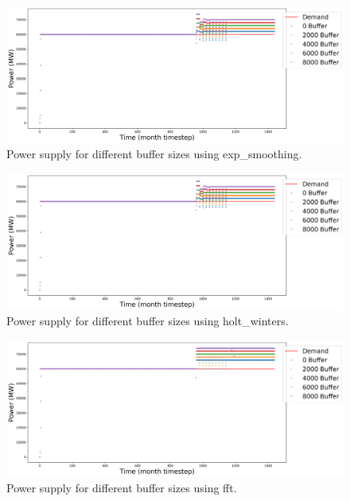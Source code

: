 \documentclass[11pt]{article}
\begin{document}
\begin{figure}[!h]
	\centering
	\includegraphics[width=\textwidth]{23-figures/23-power-buffer-exp_smoothing.png} 
	\hfill
    \caption{Power supply for different buffer sizes using exp\_smoothing.}
	\label{fig:23-buf-exp_smoothing}
\end{figure}

\begin{figure}[!h]
	\centering
	\includegraphics[width=\textwidth]{23-figures/23-power-buffer-holt_winters.png} 
	\hfill
	\caption{Power supply for different buffer sizes using holt\_winters.}
	\label{fig:23-buf-hots_winters}
\end{figure}

\begin{figure}[!h]
	\centering
	\includegraphics[width=\textwidth]{23-figures/23-power-buffer-fft.png} 
	\hfill
    \caption{Power supply for different buffer sizes using fft.}
	\label{fig:23-buf-fft}
\end{figure}
\end{document}
